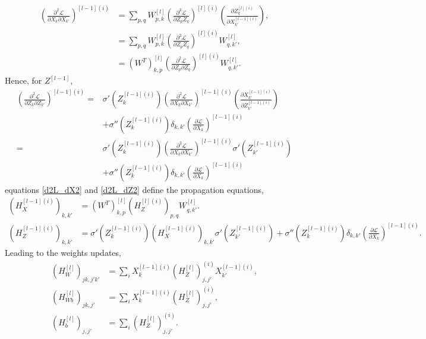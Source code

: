 \documentclass[11pt,twocolumn]{article}
\begin{document}
\begin{align}
\left(\frac{\partial^2 \mathcal{L}}{\partial X_{k}\partial X_{k'}}\right)^{[l-1](i)}
&=\sum_{p,q} W_{p,k}^{[l]}\left(\frac{\partial^2 \mathcal{L}}{\partial Z_{p} Z_{q}}\right)^{[l](i)}\left(\frac{\partial Z_{q}^{[l](i)}}{\partial X_{k'}^{[l-1](i)}}\right),\\
&=\sum_{p,q} W_{p,k}^{[l]}\left(\frac{\partial^2 \mathcal{L}}{\partial Z_{p} Z_{q}}\right)^{[l](i)}W_{q,k'}^{[l]},\\
&=\left(W^{T}\right)_{k,p}^{[l]}\left(\frac{\partial^2 \mathcal{L}}{\partial Z_{p} \partial Z_{q}}\right)^{[l](i)} W_{q,k'}^{[l]}\label{d2L_dX2}.
\end{align}
Hence, for $Z^{[l-1]}$,
\begin{align}
\left(\frac{\partial^2 \mathcal{L}}{\partial Z_{k} \partial Z_{k'}}\right)^{[l-1](i)}=& \sigma'{(Z_{k}^{[l-1](i)})}\left(\frac{\partial^2 \mathcal{L}}{\partial X_{k}\partial X_{k'}}\right)^{[l-1](i)} \left(\frac{\partial X_{k'}^{[l-1](i)}}{\partial Z_{k'}^{[l-1](i)}}\right)\\
&+\sigma''{(Z_{k}^{[l-1](i)})}\delta_{k,k'}\left(\frac{\partial \mathcal{L}}{\partial X_{k}}\right)^{[l-1](i)}\\
=&\sigma'{(Z_{k}^{[l-1](i)})}\left(\frac{\partial^2 \mathcal{L}}{\partial X_{k}\partial X_{k'}}\right)^{[l-1](i)} \sigma'{(Z_{k'}^{[l-1](i)})}\\
&+\sigma''{(Z_{k}^{[l-1](i)})}\delta_{k,k'}\left(\frac{\partial \mathcal{L}}{\partial X_{k}}\right)^{[l-1](i)}\label{d2L_dZ2}
\end{align}
equations \ref{d2L_dX2} and \ref{d2L_dZ2} define the propagation equations,
\begin{align}
(H_X^{[l-1](i)})_{k,k'}&=\left(W^{T}\right)_{k,p}^{[l]} (H_Z^{[l](i)})_{p,q}W_{q,k'}^{[l]}.\label{backprop_HX}\\
(H_Z^{[l-1](i)})_{k,k'}&=\sigma'{(Z_{k}^{[l-1](i)})}(H_X^{[l-1](i)})_{k,k'} \sigma'{(Z_{k'}^{[l-1](i)})}+\sigma''{(Z_{k}^{[l-1](i)})}\delta_{k,k'}\left(\frac{\partial \mathcal{L}}{\partial X_{k}}\right)^{[l-1](i)}\label{backprop_HZ}.
\end{align}
Leading to the weights updates,
\begin{align}
(H_W^{[l]})_{jk,j'k'}&=\sum_{i}X_{k}^{[l-1](i)}(H_Z^{[l]})^{(i)}_{j,j'}X_{k'}^{[l-1](i)},\\
(H_{Wb}^{[l]})_{jk,j'}&=\sum_{i}X_{k}^{[l-1](i)}(H_Z^{[l]})^{(i)}_{j,j'},\\
(H_b^{[l]})_{j,j'}&=\sum_{i}(H_Z^{[l]})^{(i)}_{j,j'}.\label{H_b_final}
\end{align}
\end{document}
